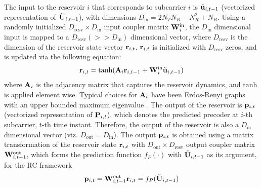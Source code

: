 \documentclass[conference]{IEEEtran}
\begin{document}
{The input to the reservoir $i$ that corresponds to subcarrier $i$ is $\tilde{{\bf u}}_{i,t-1}$ (vectorized representation of $\tilde{{\bf U}}_{i,t-1}$), with dimensions $D_{\text{in}}=2N_TN_R-N_R^2+N_R$.
Using a randomly initialized $D_{\text{resv}}\times D_{\text{in}}$ input coupler matrix ${\bf W}^{\text{in}}_i$, the $D_{\text{in}}$ dimensional input is mapped to a $D_{\text{resv}}(>>D_{\text{in}})$ dimensional vector, where $D_{\text{resv}}$ is the dimension of the reservoir state vector ${\bf r}_{i,t}$. ${\bf r}_{i,t}$ is initialized with $D_{\text{resv}}$ zeros, and is updated via the following equation:
\begin{equation}
\br_{i,t}=\text{tanh}(\bA_i\br_{i,t-1}+\bW^{\text{in}}_i\tilde{\bu}_{i,t-1})
\label{res_upd}
\end{equation}
where ${\bf A}_i$ is the adjacency matrix that captures the reservoir dynamics, and $\text{tanh}$ is applied element wise.
Typical choices for ${\bf A}_i$ have been Erdos-Renyi graphs with an upper bounded maximum eigenvalue \cite{mosleh2017brain,pathak2017using}. The output of the reservoir is ${\bf p}_{i,t}$ (vectorized representation of ${\bf P}_{i,t}$), which denotes the predicted precoder at $i$-th subcarrier, $t$-th time instant.
Therefore, the output of the reservoir is also a $D_{\text{in}}$ dimensional vector (viz. $D_{\text{out}}=D_{\text{in}}$).
The output ${\bf p}_{i,t}$ is obtained using a matrix transformation of the reservoir state ${\bf r}_{i,t}$ with $D_{\text{out}}\times D_{\text{resv}}$ output coupler matrix ${\bf W}^{\text{out}}_{i,t-1}$, which forms the prediction function $f_P(\cdot)$ with $\tilde{{\bf U}}_{i,t-1}$ as its argument, for the RC framework
\begin{equation}
\bp_{i,t}=\bW^{\text{out}}_{i,t-1}\br_{i,t}=f_P(\tilde{\bU}_{i,t-1})
\label{pred_op}
\end{equation}

}
\end{document}
